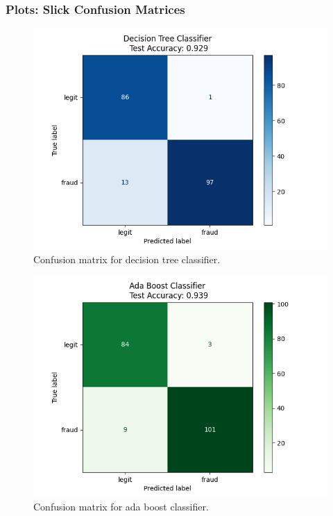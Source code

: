 \documentclass{article}
\begin{document}
\newpage

\subsubsection*{Plots: Slick Confusion Matrices}

\begin{center}
  \begin{figure}[H]
    \includegraphics{dt_classifier.png}
    \caption{Confusion matrix for decision tree classifier.}
  \end{figure}
\end{center}

\begin{center}
  \begin{figure}[H]
    \includegraphics{boost_classifier.png}
    \caption{Confusion matrix for ada boost classifier.}
  \end{figure}
\end{center}
\end{document}
